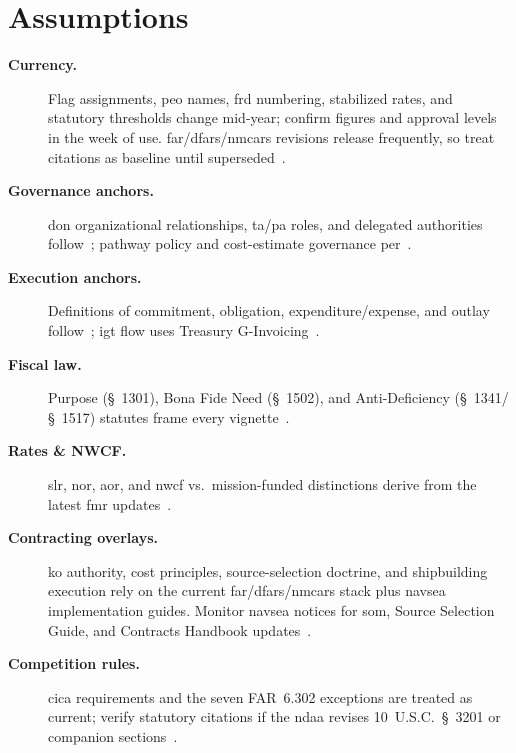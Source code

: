 \documentclass[../main.tex]{subfiles}
\begin{document}

\section{Assumptions}
\begin{description}
  \item[\textbf{Currency.}] Flag assignments, \ac{peo} names, \ac{frd} numbering, stabilized rates, and statutory thresholds change mid-year; confirm figures and approval levels in the week of use. \ac{far}/\ac{dfars}/\ac{nmcars} revisions release frequently, so treat citations as baseline until superseded~\autocite{FAR,DFARS,NMCARS}.
  \item[\textbf{Governance anchors.}] \ac{don} organizational relationships, \ac{ta}/\ac{pa} roles, and delegated authorities follow~\autocite{SECNAV5400-15D,SECNAV5000-2G}; pathway policy and cost-estimate governance per~\autocite{DoDI5000-85}.
  \item[\textbf{Execution anchors.}] Definitions of commitment, obligation, expenditure/expense, and outlay follow~\autocite{DoDFMR-Vol3}; \ac{igt} flow uses Treasury G-Invoicing~\autocite{Treasury-GInvoicing}.
  \item[\textbf{Fiscal law.}] Purpose (\S~1301), Bona Fide Need (\S~1502), and Anti-Deficiency (\S~1341/\S~1517) statutes frame every vignette~\autocite{USC-1301-Purpose,USC-1502-BFN,USC-1341-ADA}.
  \item[\textbf{Rates \& NWCF.}] \ac{slr}, \ac{nor}, \ac{aor}, and \ac{nwcf} vs.\ mission-funded distinctions derive from the latest \ac{fmr} updates~\autocite{DoDFMR-Vol3,DoDFMR-Vol3-Ch19}.
  \item[\textbf{Contracting overlays.}] \ac{ko} authority, cost principles, source-selection doctrine, and shipbuilding execution rely on the current \ac{far}/\ac{dfars}/\ac{nmcars} stack plus \ac{navsea} implementation guides. Monitor \ac{navsea} notices for \ac{som}, Source Selection Guide, and Contracts Handbook updates~\autocite{FAR,DFARS,NMCARS,SOM-Ch3-2023,NAVSEA-Source-Selection-Guide-2022,NAVSEA-Contracts-Handbook-2023}.
  \item[\textbf{Competition rules.}] \ac{cica} requirements and the seven FAR~6.302 exceptions are treated as current; verify statutory citations if the \ac{ndaa} revises 10~U.S.C.~\S~3201 or companion sections~\autocite{USC-3201-CICA,FAR}.

\end{description}
\end{document}
